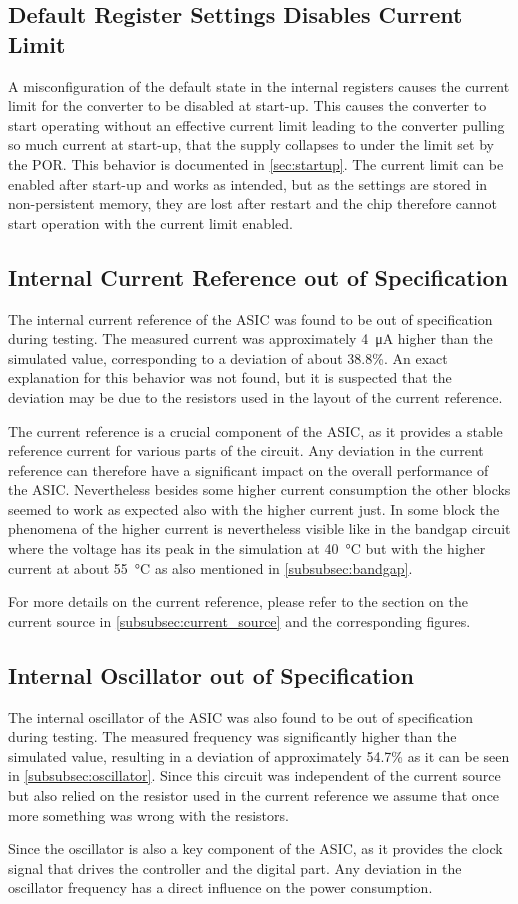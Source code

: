 \subsection{Default Register Settings Disables Current Limit}
\label{sec:missingcurrentlimit}

A misconfiguration of the default state in the internal registers causes the current limit for the converter to be disabled at start-up. This causes the converter to start operating without an effective current limit leading to the converter pulling so much current at start-up, that the supply collapses to under the limit set by the \ac{POR}. This behavior is documented in \autoref{sec:startup}. The current limit can be enabled after start-up and works as intended, but as the settings are stored in non-persistent memory, they are lost after restart and the chip therefore cannot start operation with the current limit enabled. 


\subsection{Internal Current Reference out of Specification}
The internal current reference of the ASIC was found to be out of specification during testing. The measured current was approximately \qty{4}{\micro\ampere} higher than the simulated value, corresponding to a deviation of about 38.8\%. An exact explanation for this behavior was not found, but it is suspected that the deviation may be due to the resistors used in the layout of the current reference.

The current reference is a crucial component of the \ac{ASIC}, as it provides a stable reference current for various parts of the circuit. Any deviation in the current reference can therefore have a significant impact on the overall performance of the \ac{ASIC}. Nevertheless besides some higher current consumption the other blocks seemed to work as expected also with the higher current just. In some block the phenomena of the higher current is nevertheless visible like in the bandgap circuit where the voltage has its peak in the simulation at \qty{40}{\degreeCelsius} but with the higher current at about \qty{55}{\degreeCelsius} as also mentioned in \autoref{subsubsec:bandgap}.

For more details on the current reference, please refer to the section on the current source in \autoref{subsubsec:current_source} and the corresponding figures.

\subsection{Internal Oscillator out of Specification}
The internal oscillator of the \ac{ASIC} was also found to be out of specification during testing. The measured frequency was significantly higher than the simulated value, resulting in a deviation of approximately 54.7\% as it can be seen in \autoref{subsubsec:oscillator}. Since this circuit was independent of the current source but also relied on the resistor used in the current reference we assume that once more something was wrong with the resistors.

Since the oscillator is also a key component of the \ac{ASIC}, as it provides the clock signal that drives the controller and the digital part. Any deviation in the oscillator frequency has a direct influence on the power consumption.
